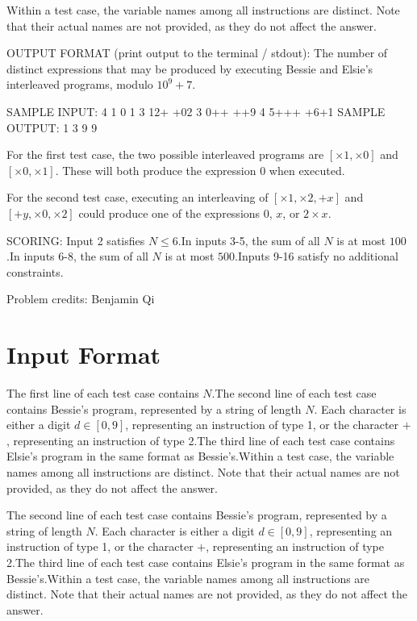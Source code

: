 \documentclass[12pt]{article}
\begin{document}
Within a test case, the variable names among all instructions are distinct. Note
that their actual names are not provided, as they do not affect the answer.

OUTPUT FORMAT (print output to the terminal / stdout):
The number of distinct expressions that may be produced by executing  Bessie and
Elsie's interleaved programs, modulo $10^9+7$.

SAMPLE INPUT:
4
1
0
1
3
12+
+02
3
0++
++9
4
5+++
+6+1
SAMPLE OUTPUT: 
1
3
9
9

For the first test case, the two possible interleaved programs are
$[\times 1, \times 0]$  and $[\times 0,\times 1]$. These will both produce the
expression $0$ when executed.

For the second test case, executing an interleaving of $[\times 1,\times 2, +x]$
and $[+y, \times 0,\times 2]$ could produce one of the expressions $0$, $x$, or
$2\times x$.

SCORING:
Input 2 satisfies $N\le 6$.In inputs 3-5, the sum of all $N$ is at most $100$.In inputs 6-8, the sum of all $N$ is at most $500$.Inputs 9-16 satisfy no additional constraints.


Problem credits: Benjamin Qi



\section*{Input Format}
The first line of each test case contains $N$.The second line of each test case contains Bessie's program, represented by a
string of length $N$. Each character is either a digit $d\in [0,9]$,
representing an instruction of type 1, or the character $+$, representing an
instruction of type 2.The third line of each test case contains Elsie's program in the same format as
Bessie's.Within a test case, the variable names among all instructions are distinct. Note
that their actual names are not provided, as they do not affect the answer.

The second line of each test case contains Bessie's program, represented by a
string of length $N$. Each character is either a digit $d\in [0,9]$,
representing an instruction of type 1, or the character $+$, representing an
instruction of type 2.The third line of each test case contains Elsie's program in the same format as
Bessie's.Within a test case, the variable names among all instructions are distinct. Note
that their actual names are not provided, as they do not affect the answer.
\end{document}
